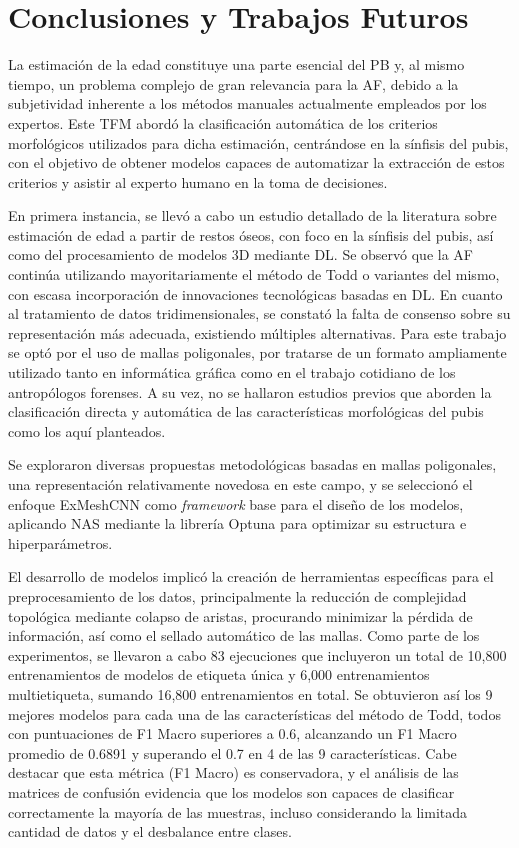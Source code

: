 \chapter{Conclusiones y Trabajos Futuros}

La estimación de la edad constituye una parte esencial del PB y, al mismo tiempo, un problema complejo de gran relevancia para la AF, debido a la subjetividad inherente a los métodos manuales actualmente empleados por los expertos. Este TFM abordó la clasificación automática de los criterios morfológicos utilizados para dicha estimación, centrándose en la sínfisis del pubis, con el objetivo de obtener modelos capaces de automatizar la extracción de estos criterios y asistir al experto humano en la toma de decisiones.

En primera instancia, se llevó a cabo un estudio detallado de la literatura sobre estimación de edad a partir de restos óseos, con foco en la sínfisis del pubis, así como del procesamiento de modelos 3D mediante DL. Se observó que la AF continúa utilizando mayoritariamente el método de Todd \cite{RefWorks:RefID:19-todd1921age} o variantes del mismo, con escasa incorporación de innovaciones tecnológicas basadas en DL. En cuanto al tratamiento de datos tridimensionales, se constató la falta de consenso sobre su representación más adecuada, existiendo múltiples alternativas. Para este trabajo se optó por el uso de mallas poligonales, por tratarse de un formato ampliamente utilizado tanto en informática gráfica como en el trabajo cotidiano de los antropólogos forenses. A su vez, no se hallaron estudios previos que aborden la clasificación directa y automática de las características morfológicas del pubis como los aquí planteados.

Se exploraron diversas propuestas metodológicas basadas en mallas poligonales, una representación relativamente novedosa en este campo, y se seleccionó el enfoque ExMeshCNN como \textit{framework} base para el diseño de los modelos, aplicando NAS mediante la librería Optuna \cite{optuna_2019} para optimizar su estructura e hiperparámetros.

El desarrollo de modelos implicó la creación de herramientas específicas para el preprocesamiento de los datos, principalmente la reducción de complejidad topológica mediante colapso de aristas, procurando minimizar la pérdida de información, así como el sellado automático de las mallas. Como parte de los experimentos, se llevaron a cabo 83 ejecuciones que incluyeron un total de 10,800 entrenamientos de modelos de etiqueta única y 6,000 entrenamientos multietiqueta, sumando 16,800 entrenamientos en total. Se obtuvieron así los 9 mejores modelos para cada una de las características del método de Todd, todos con puntuaciones de F1 Macro superiores a 0.6, alcanzando un F1 Macro promedio de 0.6891 y superando el 0.7 en 4 de las 9 características. Cabe destacar que esta métrica (F1 Macro) es conservadora, y el análisis de las matrices de confusión evidencia que los modelos son capaces de clasificar correctamente la mayoría de las muestras, incluso considerando la limitada cantidad de datos y el desbalance entre clases.

